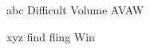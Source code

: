 \documentclass{article}
\begin{document}
\showoutput


abc Difficult Volume AVAW

\textsf{xyz find fling Win}
\end{document}
